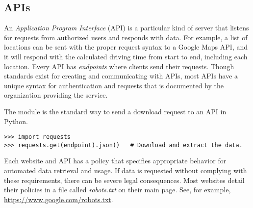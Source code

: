 \subsection*{APIs}

An \emph{Application Program Interface} (API) is a particular kind of server that listens for requests from authorized users and responds with data.
For example, a list of locations can be sent with the proper request syntax to a Google Maps API, and it will respond with the calculated driving time from start to end, including each location.
Every API has \emph{endpoints} where clients send their requests.
Though standards exist for creating and communicating with APIs, most APIs have a unique syntax for authentication and requests that is documented by the organization providing the service.

The  module is the standard way to send a download request to an API in Python.

\vspace{2mm}
\begin{lstlisting}
>>> import requests
>>> requests.get(endpoint).json()   # Download and extract the data.
\end{lstlisting}





\begin{warn}
Each website and API has a policy that specifies appropriate behavior for automated data retrieval and usage.
If data is requested without complying with these requirements, there can be severe legal consequences.
Most websites detail their policies in a file called \emph{robots.txt} on their main page.
See, for example, \url{https://www.google.com/robots.txt}.
\end{warn}

